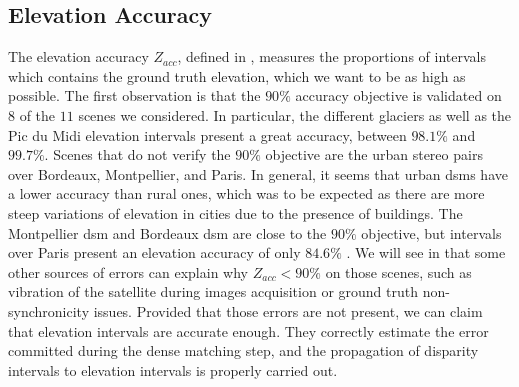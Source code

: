 \subsection{Elevation Accuracy}
The elevation accuracy $Z_{acc}$, defined in , measures the proportions of intervals which contains the ground truth elevation, which we want to be as high as possible. The first observation is that the $90\%$ accuracy objective is validated on $8$ of the $11$ scenes we considered. In particular, the different glaciers as well as the Pic du Midi elevation intervals present a great accuracy, between $98.1\%$ and $99.7\%$. Scenes that do not verify the $90\%$ objective are the urban stereo pairs over Bordeaux, Montpellier, and Paris. In general, it seems that urban \acrshort{dsm}s have a lower accuracy than rural ones, which was to be expected as there are more steep variations of elevation in cities due to the presence of buildings. The Montpellier \acrshort{dsm} and Bordeaux \acrshort{dsm} are close to the $90\%$ objective, but intervals over Paris present an elevation accuracy of only $84.6\%$ . We will see in  that some other sources of errors can explain why $Z_{acc}<90\%$ on those scenes, such as vibration of the satellite during images acquisition or ground truth non-synchronicity issues. Provided that those errors are not present, we can claim that elevation intervals are accurate enough. They correctly estimate the error committed during the dense matching step, and the propagation of disparity intervals to elevation intervals is properly carried out.


